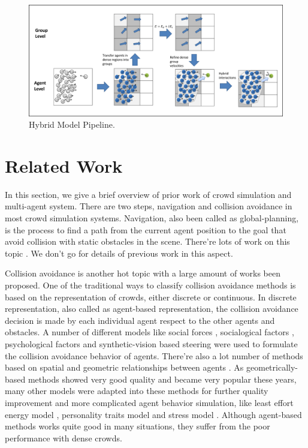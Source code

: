 \documentclass{egpubl}
\begin{document}
\begin{figure}
  \centering
  \includegraphics[width=6.4in]{images/pipeline}
  \caption{Hybrid Model Pipeline.}
  \label{fig:pipeline}
\end{figure}

\section{Related Work}
In this section, we give a brief overview of prior work of crowd simulation and multi-agent system. There are two steps, navigation and collision avoidance in most crowd simulation systems. Navigation, also been called as global-planning, is the process to find a path from the current agent position to the goal that avoid collision with static obstacles in the scene. There're lots of work on this topic \cite{Funge:1999,Bayanzit:2002,Lamarche:2004,Sud:2007,Sud:2008}. We don't go for details of previous work in this aspect.

Collision avoidance is another hot topic with a large amount of works been proposed. One of the traditional ways to classify collision avoidance methods is based on the representation of crowds, either discrete or continuous. In discrete representation, also called as agent-based representation, the collision avoidance decision is made by each individual agent respect to the other agents and obstacles. A number of different models like social forces \cite{Helbing:1995,Helbing:2005,Gayle:2009,Sud:2007}, socialogical factors \cite{Musse:1997}, psychological factors \cite{Pelechano:2008} and synthetic-vision based steering \cite{Ondrej:2010} were used to formulate the collision avoidance behavior of agents. There're also a lot number of methods based on spatial and geometric relationships between agents \cite{VDBerg:2008,VDBerg:2009,Guy:2009,VDBerg:2011}. As geometrically-based methods showed very good quality and became very popular these years, many other models were adapted into these methods for further quality improvement and more complicated agent behavior simulation, like least effort energy model \cite{Guy:2010}, personality traits model \cite{Guy:2011} and stress model \cite{Kim:2012}. Although agent-based methods works quite good in many situations, they suffer from the poor performance with dense crowds.
\end{document}
